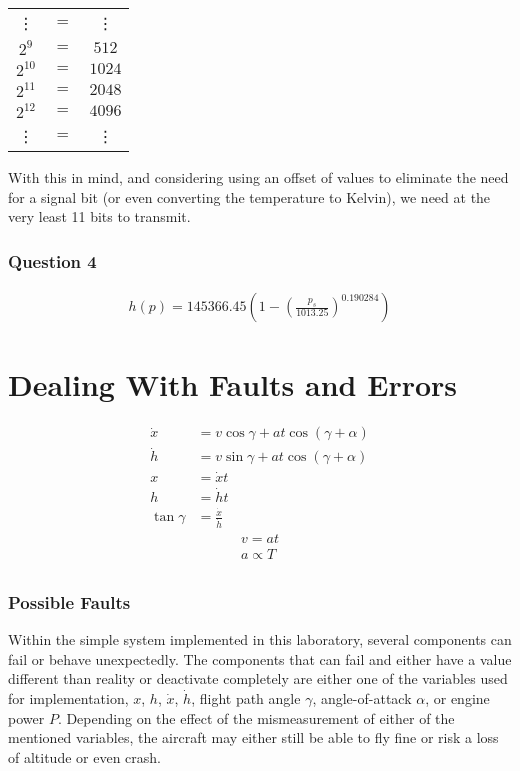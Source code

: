 \documentclass[english,palatino]{ist-report}
\begin{document}
\begin{table}[ht]
	\centering
	\begin{tabular}{ccc}
		\vdots		& $=$	& \vdots	\\
		$2^9$		& $=$	& $512$		\\
		$2^{10}$	& $=$	& $1024$	\\
		$2^{11}$	& $=$	& $2048$	\\
		$2^{12}$	& $=$	& $4096$	\\
		\vdots		& $=$	& \vdots	\\
	\end{tabular}
\end{table}

With this in mind, and considering using an offset of values to eliminate the need for a signal bit (or even converting the temperature to Kelvin), we need at the very least 11 bits to transmit.

\section{Question 4}

\begin{gather*}
	h(p) = 145366.45\left(1 - \left(\frac{p_s}{1013.25}\right)^{0.190284}\right)
\end{gather*}

\part{Dealing With Faults and Errors}

\begin{align*}
	\dot{x} &= v\cos\gamma + at\cos(\gamma + \alpha) \\
	\dot{h} &= v\sin\gamma + at\cos(\gamma + \alpha) \\
	x &= \dot{x}t \\
	h &= \dot{h}t \\
	\tan\gamma &= \frac{\dot{x}}{\dot{h}}
\end{align*}
\begin{gather*}
	v = at \\
	a \propto T \\
\end{gather*}

\section{Possible Faults}

Within the simple system implemented in this laboratory, several components can fail or behave unexpectedly. The components that can fail and either have a value different than reality or deactivate completely are either one of the variables used for implementation, $x$, $h$, $\dot{x}$, $\dot{h}$, flight path angle $\gamma$, angle-of-attack $\alpha$, or engine power $P$. Depending on the effect of the mismeasurement of either of the mentioned variables, the aircraft may either still be able to fly fine or risk a loss of altitude or even crash.
\end{document}
